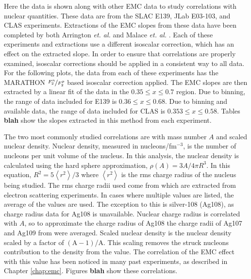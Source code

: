 Here the data is shown along with other EMC data to study correlations with nuclear quantities. These data are from the SLAC E139, JLab E03-103, and CLAS experiments. Extractions of the EMC slopes from these data have been completed by both Arrington \textit{et. al.} \cite{arrington_src} and Malace \textit{et. al.} \cite{malace_emc}. Each of these experiments and extractions use a different isoscalar correction, which has an effect on the extracted slope. In order to ensure that correlations are properly examined, isoscalar corrections should be applied in a consistent way to all data. For the following plots, the data from each of these experiments has the MARATHON $\nicefrac{F_2^n}{F_2^p}$ based isoscalar correction applied. The EMC slopes are then extracted by a linear fit of the data in the $0.35 \leq x \leq 0.7$ region. Due to binning, the range of data included for E139 is $0.36 \leq x \leq 0.68$. Due to binning and available data, the range of data included for CLAS is $0.353 \leq x \leq 0.58$. Tables \textbf{blah} show the slopes extracted in this method from each experiment.

The two most commonly studied correlations are with mass number $A$ and scaled nuclear density. Nuclear density, measured in nucleons/fm$^{-3}$, is the number of nucleons per unit volume of the nucleus. In this analysis, the nuclear density is calculated using the hard sphere approximation, $\rho\left(A\right) = 3A/4\pi R^3$. In this equation, $R^2=5\left<r^2\right>/3$ where $\left<r^2\right>$ is the rms charge radius of the nucleus being studied. The rms charge radii used come from \cite{DeVries} which are extracted from electron scattering experiments. In cases where multiple values are listed, the average of the values are used. The exception to this is silver-108 (Ag108), as charge radius data for Ag108 is unavailable. Nuclear charge radius is correlated with $A$, so to approximate the charge radius of Ag108 the charge radii of Ag107 and Ag109 from \cite{2012_charge_radii} were averaged. Scaled nuclear density is the nuclear density scaled by a factor of $\left(\text{A}-1\right)$/A. This scaling removes the struck nucleons contribution to the density from the value. The correlation of the EMC effect with this value has been noticed in many past experiments, as described in Chapter \ref{chap:emc}. Figures \textbf{blah} show these correlations.

